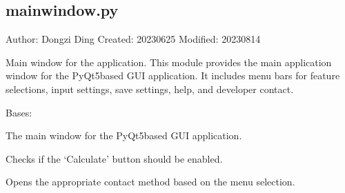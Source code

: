 \documentclass[a4paper,10pt,english]{sphinxmanual}
\begin{document}
\subsection{mainwindow.py}
\label{\detokenize{src:mainwindow-py}}
\sphinxAtStartPar
Author: Dongzi Ding
Created: 2023\sphinxhyphen{}06\sphinxhyphen{}25
Modified: 2023\sphinxhyphen{}08\sphinxhyphen{}14

\sphinxAtStartPar
Main window for the application.
This module provides the main application window for the PyQt5\sphinxhyphen{}based GUI application.
It includes menu bars for feature selections, input settings, save settings, help, and developer contact.

\begin{fulllineitems}
\label{\detokenize{src:src.mainwindow.MainWindow}}
\pysigstartsignatures
{}
\pysigstopsignatures
\sphinxAtStartPar
Bases: 

\sphinxAtStartPar
The main window for the PyQt5\sphinxhyphen{}based GUI application.

\begin{fulllineitems}
\label{\detokenize{src:src.mainwindow.MainWindow.check_calculate_button_state}}
\pysigstartsignatures
{}
\pysigstopsignatures
\sphinxAtStartPar
Checks if the ‘Calculate’ button should be enabled.

\end{fulllineitems}


\begin{fulllineitems}
\label{\detokenize{src:src.mainwindow.MainWindow.open_contact}}
\pysigstartsignatures
{}
\pysigstopsignatures
\sphinxAtStartPar
Opens the appropriate contact method based on the menu selection.


\end{fulllineitems}
\end{fulllineitems}
\end{document}
